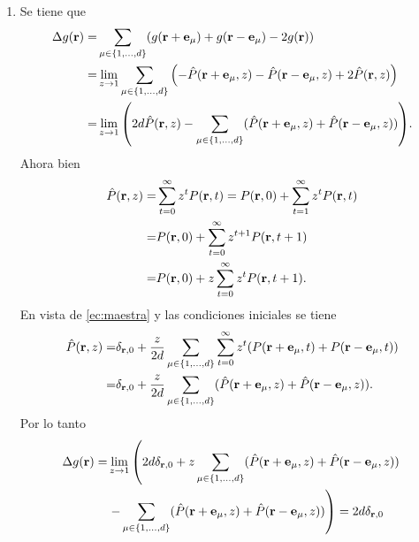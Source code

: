 \documentclass{article}
\begin{document}
\begin{enumerate}
\item Se tiene que
\begin{align}
\begin{split}
\Delta g(\vb{r})=&\sum_{\mu\in\{1,\dots,d\}}(g(\vb{r}+\vb{e_\mu})+g(\vb{r}-\vb{e_\mu})-2g(\vb{r}))\\
=&\lim_{z\rightarrow 1}\sum_{\mu\in\{1,\dots,d\}}\qty(-\hat{P}(\vb{r}+\vb{e}_\mu,z)-\hat{P}(\vb{r}-\vb{e}_\mu,z)+2\hat{P}(\vb{r},z))\\
=&\lim_{z\rightarrow 1}\qty(2d\hat{P}(\vb{r},z)-\sum_{\mu\in\{1,\dots,d\}}(\hat{P}(\vb{r}+\vb{e}_\mu,z)+\hat{P}(\vb{r}-\vb{e}_\mu,z))).
\end{split}
\end{align}
Ahora bien
\begin{align}
\begin{split}
\hat{P}(\vb{r},z)=&\sum_{t=0}^\infty z^tP(\vb{r},t)=P(\vb{r},0)+\sum_{t=1}^\infty z^t P(\vb{r},t)\\
=&P(\vb{r},0)+\sum_{t=0}^\infty z^{t+1} P(\vb{r},t+1)\\
=&P(\vb{r},0)+z\sum_{t=0}^\infty z^{t} P(\vb{r},t+1).
\end{split}
\end{align}
En vista de \eqref{ec:maestra}  y las condiciones iniciales se tiene
\begin{align}
\begin{split}
\hat{P}(\vb{r},z)=&\delta_{\vb{r},0}+\frac{z}{2d}\sum_{\mu\in\{1,\dots,d\}}\sum_{t=0}^\infty z^t(P(\vb{r}+\vb{e}_\mu,t)+P(\vb{r}-\vb{e}_\mu,t))\\
=&\delta_{\vb{r},0}+\frac{z}{2d}\sum_{\mu\in\{1,\dots,d\}}(\hat{P}(\vb{r}+\vb{e}_\mu,z)+\hat{P}(\vb{r}-\vb{e}_\mu,z)).
\end{split}
\end{align}
Por lo tanto
\begin{align}
\begin{split}
\Delta g(\vb{r})=&\lim_{z\rightarrow 1}\left(2d\delta_{\vb{r},0}+z\sum_{\mu\in\{1,\dots,d\}}(\hat{P}(\vb{r}+\vb{e}_\mu,z)+\hat{P}(\vb{r}-\vb{e}_\mu,z))\right.\\
&\left.-\sum_{\mu\in\{1,\dots,d\}}(\hat{P}(\vb{r}+\vb{e}_\mu,z)+\hat{P}(\vb{r}-\vb{e}_\mu,z))\right)=2d\delta_{\vb{r},0}
\end{split}
\end{align}


\end{enumerate}
\end{document}
